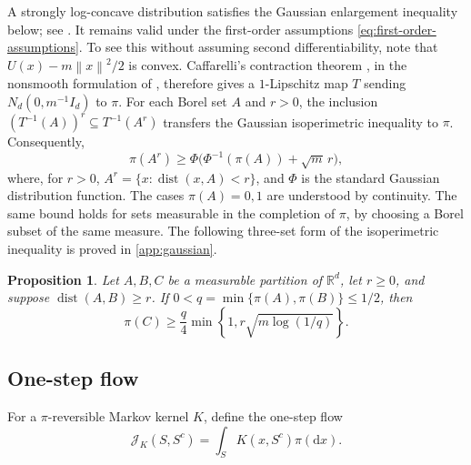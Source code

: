 \documentclass[11pt]{article}
\newtheorem{proposition}[proposition]{Proposition}
\newcommand{\R}{\mathbb R}
\newcommand{\norm}[1]{\left\lVert #1\right\rVert}
\newcommand{\1}{\mathbf 1}
\newcommand{\df}{\mathrm{d}}
\begin{document}
	A strongly log-concave distribution satisfies the Gaussian enlargement
	inequality below; see \citet[Corollary~2.2 and equations~(2.10)--(2.12)]{BakryLedoux1996}.
	It remains valid under the first-order assumptions
	\eqref{eq:first-order-assumptions}. To see this without assuming second
	differentiability, note that \(U(x)-m\norm{x}^2/2\) is convex.
	Caffarelli's contraction theorem \citep{Caffarelli2000}, in the nonsmooth
	formulation of \citet[Theorem~1.1, Lemma 3.3, and the conclusion of Section~3]{KimMilman2012},
	therefore gives a \(1\)-Lipschitz map \(T\) sending
	\(N_d(0,m^{-1}I_d)\) to \(\pi\).
	For each Borel set \(A\) and \(r>0\), the inclusion
	\((T^{-1}(A))^r\subseteq T^{-1}(A^r)\) transfers the Gaussian
	isoperimetric inequality to \(\pi\). Consequently,
	\begin{equation}\label{eq:bakry-ledoux-enlargement}
		\pi(A^r)
		\geq
		\Phi\bigl(\Phi^{-1}(\pi(A))+\sqrt{m}\,r\bigr),
	\end{equation}
	where, for \(r>0\),
	\(A^r=\{x:\operatorname{dist}(x,A)<r\}\), and \(\Phi\) is the standard
	Gaussian distribution function. The cases \(\pi(A)=0,1\) are understood by
	continuity. The same bound holds for sets measurable in the completion of
	\(\pi\), by choosing a Borel subset of the same measure.
	The following three-set form of the isoperimetric inequality is proved
	in \cref{app:gaussian}.
	
	\begin{proposition}\label{prop:separated}
		Let \(A,B,C\) be a measurable partition of \(\R^d\), let \(r\geq0\), and suppose
		\(\operatorname{dist}(A,B)\geq r\).  If
		\(0<q=\min\{\pi(A),\pi(B)\}\leq1/2\), then
		\begin{equation}\label{eq:separated}
			\pi(C)
			\geq
			\frac{q}{4}
			\min\left\{1,r\sqrt{m\log(1/q)}\right\}.
		\end{equation}
	\end{proposition}
	
	
	\subsection{One-step flow}
	
	For a $\pi$-reversible Markov kernel \(K\), define the one-step flow
	\[
	\mathcal{J}_K(S,S^c)=\int_S K(x,S^c)\pi(\df x).
	\]
	
\end{document}
